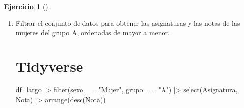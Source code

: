 \documentclass[
  a4paper,
]{scrreport}
\newenvironment{Shaded}{\begin{snugshade}}{\end{snugshade}}
\newcommand{\ExtensionTok}[1]{\textcolor[rgb]{0.00,0.23,0.31}{#1}}
\newcommand{\FunctionTok}[1]{\textcolor[rgb]{0.28,0.35,0.67}{#1}}
\newcommand{\NormalTok}[1]{\textcolor[rgb]{0.00,0.23,0.31}{#1}}
\newcommand{\SpecialCharTok}[1]{\textcolor[rgb]{0.37,0.37,0.37}{#1}}
\newcommand{\StringTok}[1]{\textcolor[rgb]{0.13,0.47,0.30}{#1}}
\theoremstyle{definition}
\newtheorem{exercise}{Ejercicio}[chapter]
\theoremstyle{remark}
\begin{document}
\begin{exercise}[]
\begin{enumerate}
\begin{tcolorbox}
  \section{Copilot}

\begin{Shaded}
\begin{Highlighting}[]
\ExtensionTok{Usar}\NormalTok{ la función cut para crear una nueva columna de nombre Calificación que categorice las notas según los siguientes intervalos:}
\ExtensionTok{{-}}\NormalTok{ SS: Nota menor de 5}
\ExtensionTok{{-}}\NormalTok{ AP: Nota de 5 a 6.9}
\ExtensionTok{{-}}\NormalTok{ NT: Nota de 7 a 8.9}
\ExtensionTok{{-}}\NormalTok{ SB: Nota de 9 a 10}
\end{Highlighting}
\end{Shaded}

  \end{tcolorbox}
\item
  Filtrar el conjunto de datos para obtener las asignaturas y las notas
  de las mujeres del grupo A, ordenadas de mayor a menor.

  \begin{tcolorbox}[enhanced jigsaw, colframe=quarto-callout-tip-color-frame, toprule=.15mm, bottomtitle=1mm, breakable, opacitybacktitle=0.6, toptitle=1mm, colback=white, bottomrule=.15mm, title=\textcolor{quarto-callout-tip-color}{\faLightbulb}\hspace{0.5em}{Solución}, arc=.35mm, left=2mm, titlerule=0mm, rightrule=.15mm, coltitle=black, leftrule=.75mm, opacityback=0, colbacktitle=quarto-callout-tip-color!10!white]

  \section{Tidyverse}

\begin{Shaded}
\begin{Highlighting}[]
\NormalTok{df\_largo }\SpecialCharTok{|\textgreater{}}
    \FunctionTok{filter}\NormalTok{(sexo }\SpecialCharTok{==} \StringTok{"Mujer"}\NormalTok{, grupo }\SpecialCharTok{==} \StringTok{"A"}\NormalTok{) }\SpecialCharTok{|\textgreater{}}
    \FunctionTok{select}\NormalTok{(Asignatura, Nota) }\SpecialCharTok{|\textgreater{}}
    \FunctionTok{arrange}\NormalTok{(}\FunctionTok{desc}\NormalTok{(Nota))}
\end{Highlighting}
\end{Shaded}


\end{tcolorbox}
\end{enumerate}
\end{exercise}
\end{document}
